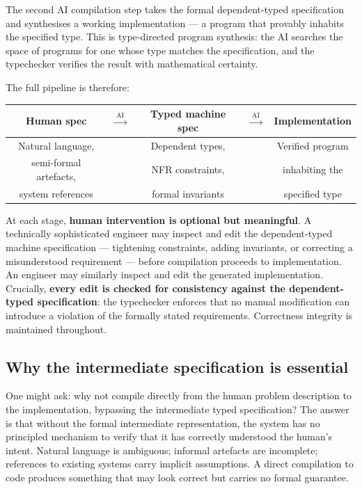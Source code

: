 \documentclass[12pt]{article}
\begin{document}
The second AI compilation step takes the formal dependent-typed specification
and synthesises a working implementation --- a program that provably inhabits
the specified type. This is type-directed program synthesis: the AI searches
the space of programs for one whose type matches the specification, and the
typechecker verifies the result with mathematical certainty.

The full pipeline is therefore:

\vspace{0.8em}
\begin{center}
\begin{tabular}{@{}ccccc@{}}
\toprule
\textbf{Human spec} & $\xrightarrow{\;\text{AI}\;}$ &
\textbf{Typed machine spec} & $\xrightarrow{\;\text{AI}\;}$ &
\textbf{Implementation} \\
\midrule
Natural language, & & Dependent types, & & Verified program \\
semi-formal artefacts, & & NFR constraints, & & inhabiting the \\
system references & & formal invariants & & specified type \\
\bottomrule
\end{tabular}
\end{center}
\vspace{0.8em}

At each stage, \textbf{human intervention is optional but meaningful}. A
technically sophisticated engineer may inspect and edit the dependent-typed
machine specification --- tightening constraints, adding invariants, or
correcting a misunderstood requirement --- before compilation proceeds to
implementation. An engineer may similarly inspect and edit the generated
implementation. Crucially, \textbf{every edit is checked for consistency
against the dependent-typed specification}: the typechecker enforces that no
manual modification can introduce a violation of the formally stated
requirements. Correctness integrity is maintained throughout.

\subsection{Why the intermediate specification is essential}

One might ask: why not compile directly from the human problem description to
the implementation, bypassing the intermediate typed specification? The answer
is that without the formal intermediate representation, the system has no
principled mechanism to verify that it has correctly understood the human's
intent. Natural language is ambiguous; informal artefacts are incomplete;
references to existing systems carry implicit assumptions. A direct
compilation to code produces something that may look correct but carries no
formal guarantee.
\end{document}
